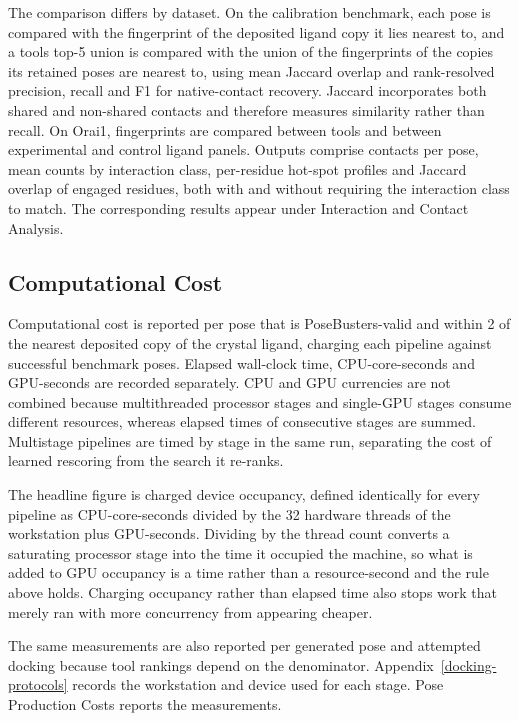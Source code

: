 The comparison differs by dataset. On the calibration benchmark, each pose is compared with the fingerprint of the deposited ligand copy it lies nearest to, and a tool\textquotesingle s top-5 union is compared with the union of the fingerprints of the copies its retained poses are nearest to, using mean Jaccard overlap and rank-resolved precision, recall and F1 for native-contact recovery. Jaccard incorporates both shared and non-shared contacts and therefore measures similarity rather than recall. On Orai1, fingerprints are compared between tools and between experimental and control ligand panels. Outputs comprise contacts per pose, mean counts by interaction class, per-residue hot-spot profiles and Jaccard overlap of engaged residues, both with and without requiring the interaction class to match. The corresponding results appear under Interaction and Contact Analysis.

\hypertarget{computational-cost}{%
\subsection{Computational Cost}\label{computational-cost}}

Computational cost is reported per pose that is PoseBusters-valid and within 2\angstrom{} of the nearest deposited copy of the crystal ligand, charging each pipeline against successful benchmark poses. Elapsed wall-clock time, CPU-core-seconds and GPU-seconds are recorded separately. CPU and GPU currencies are not combined because multithreaded processor stages and single-GPU stages consume different resources, whereas elapsed times of consecutive stages are summed. Multistage pipelines are timed by stage in the same run, separating the cost of learned rescoring from the search it re-ranks.

The headline figure is charged device occupancy, defined identically for every pipeline as CPU-core-seconds divided by the 32 hardware threads of the workstation plus GPU-seconds. Dividing by the thread count converts a saturating processor stage into the time it occupied the machine, so what is added to GPU occupancy is a time rather than a resource-second and the rule above holds. Charging occupancy rather than elapsed time also stops work that merely ran with more concurrency from appearing cheaper.

The same measurements are also reported per generated pose and attempted docking because tool rankings depend on the denominator. Appendix~\ref{docking-protocols} records the workstation and device used for each stage. Pose Production Costs reports the measurements.

